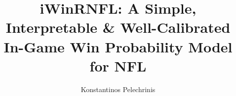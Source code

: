 \documentclass{sig-alternate}
\begin{document}
\title{iWinRNFL: A Simple, Interpretable \& Well-Calibrated In-Game Win Probability Model for NFL} 

%
\author{
%
%
\alignauthor
Konstantinos Pelechrinis\\
        \\
       \\
}


\date{}
\maketitle
\end{document}
